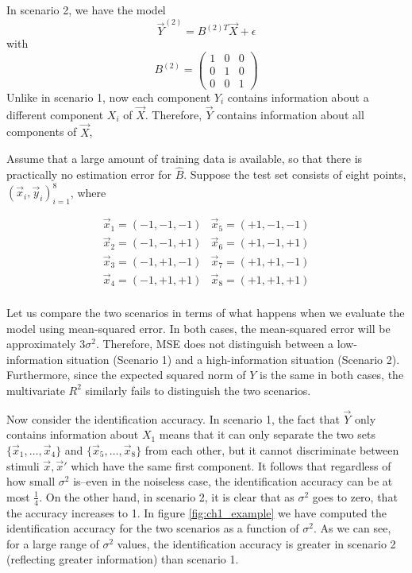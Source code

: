 In scenario 2, we have the model
\[
\vec{Y}^{(2)} = B^{(2)T} \vec{X} + \epsilon
\]
with
\[
B^{(2)} = \begin{pmatrix}
1 & 0 & 0\\
0 & 1 & 0\\
0 & 0 & 1
\end{pmatrix}
\]
Unlike in scenario 1, now each component $Y_i$ contains information
about a different component $X_i$ of $\vec{X}$.  Therefore, $\vec{Y}$
contains information about all components of $\vec{X}$,

Assume that a large amount of training data is available, so that
there is practically no estimation error for $\hat{B}$.  Suppose the
test set consists of eight points, $(\vec{x}_i, \vec{y}_i)_{i=1}^8$,
where

\[
\begin{matrix}
\vec{x}_1 = (-1, -1, -1) &
\vec{x}_5 = (+1, -1, -1) \\
\vec{x}_2 = (-1, -1, +1) &
\vec{x}_6 = (+1, -1, +1) \\
\vec{x}_3 = (-1, +1, -1) &
\vec{x}_7 = (+1, +1, -1) \\
\vec{x}_4 = (-1, +1, +1) & 
\vec{x}_8 = (+1, +1, +1) \\
\end{matrix}
\]

Let us compare the two scenarios in terms of what happens when we
evaluate the model using mean-squared error.  In both cases, the
mean-squared error will be approximately $3\sigma^2$.  Therefore, MSE
does not distinguish between a low-information situation (Scenario 1)
and a high-information situation (Scenario 2).  Furthermore, since the
expected squared norm of $Y$ is the same in both cases, the
multivariate $R^2$ similarly fails to distinguish the two scenarios.

Now consider the identification accuracy.  In scenario 1, the fact
that $\vec{Y}$ only contains information about $X_1$ means that it can
only separate the two sets $\{\vec{x}_1,\hdots, \vec{x}_4\}$ and
$\{\vec{x}_5,\hdots, \vec{x}_8\}$ from each other, but it cannot
discriminate between stimuli $\vec{x}, \vec{x}'$ which have the same
first component.  It follows that regardless of how small $\sigma^2$
is--even in the noiseless case, the identification accuracy can be at
most $\frac{1}{4}$.  On the other hand, in scenario 2, it is clear
that as $\sigma^2$ goes to zero, that the accuracy increases to 1.  In
figure \ref{fig:ch1_example} we have computed the identification
accuracy for the two scenarios as a function of $\sigma^2$.  As we can
see, for a large range of $\sigma^2$ values, the identification
accuracy is greater in scenario 2 (reflecting greater information)
than scenario 1.

